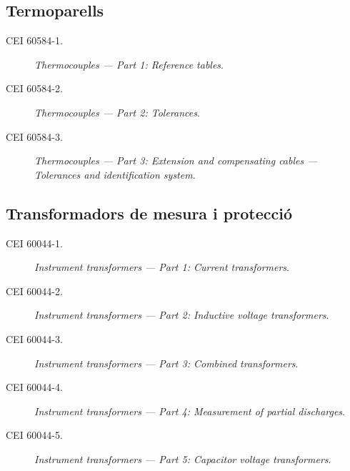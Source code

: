 \subsection*{Termoparells} 
\begin{description}
    \item [\hspace{5mm}CEI 60584-1.] \textit{Thermocouples --- Part 1: Reference tables}.
    \item [\hspace{5mm}CEI 60584-2.] \textit{Thermocouples --- Part 2: Tolerances}.
    \item [\hspace{5mm}CEI 60584-3.] \textit{Thermocouples --- Part 3: Extension and compensating cables --- Tolerances and identification system}.
\end{description}


\subsection*{Transformadors de mesura i protecció}
\begin{description}
    \item [\hspace{5mm}CEI 60044-1.] \textit{Instrument transformers --- Part 1: Current transformers}.
    \item [\hspace{5mm}CEI 60044-2.] \textit{Instrument transformers --- Part 2: Inductive voltage transformers}.
    \item [\hspace{5mm}CEI 60044-3.] \textit{Instrument transformers --- Part 3: Combined transformers}.
    \item [\hspace{5mm}CEI 60044-4.] \textit{Instrument transformers --- Part 4: Measurement of partial discharges}.
    \item [\hspace{5mm}CEI 60044-5.] \textit{Instrument transformers --- Part 5: Capacitor voltage transformers}.
\end{description}


